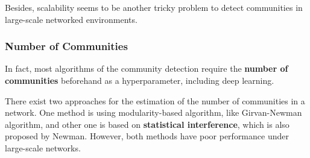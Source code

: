 \documentclass[11pt]{article}
\begin{document}
\noindent Besides, scalability seems to be another tricky problem to detect communities in large-scale networked environments.


\subsubsection{Number of Communities}
In fact, most algorithms of the community detection require the \textbf{number of communities} beforehand as a hyperparameter, including deep learning. 

\noindent There exist two approaches for the estimation of the number of communities in a network. One method is using modularity-based algorithm, like Girvan-Newman algorithm, and other one is based on \textbf{statistical interference}, which is also proposed by Newman.\cite{newman2016}
However, both methods have poor performance under large-scale networks.

\nocite{*}


\end{document}

